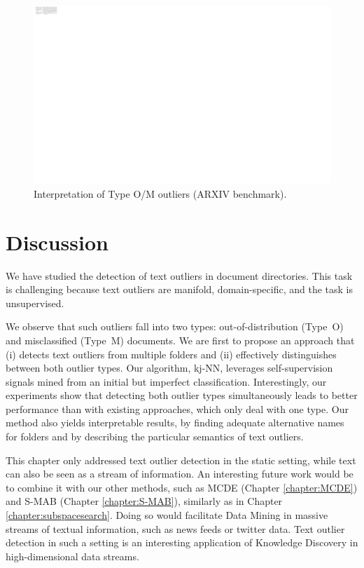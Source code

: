 \begin{figure}
	\includegraphics[width=\linewidth]{part4-figures/examples_ARXIV-Large-compressed.pdf}
	\caption{Interpretation of Type O/M outliers (ARXIV benchmark).}
	\label{fig:examples_arxiv}
\end{figure}

\section{Discussion}

We have studied the detection of text outliers in document directories. This task is challenging because text outliers are manifold, domain-specific, and the task is unsupervised. 

We observe that such outliers fall into two types: out-of-distribution (Type~O) and misclassified (Type~M) documents. We are first to propose an approach that (i) detects text outliers from multiple folders and (ii) effectively distinguishes between both outlier types. Our algorithm, \gls{kj-NN}, leverages self-supervision signals mined from an initial but imperfect classification. Interestingly, our experiments show that detecting both outlier types simultaneously leads to better performance %
than with existing approaches, which only deal with one type. Our method also yields interpretable results, by finding adequate alternative names for folders and by describing the particular semantics of text outliers. 

This chapter only addressed text outlier detection in the static setting, while text can also be seen as a stream of information. An interesting future work would be to combine it with our other methods, such as \acrshort{MCDE} (Chapter \ref{chapter:MCDE}) and \acrshort{S-MAB} (Chapter \ref{chapter:S-MAB}), similarly as in Chapter \ref{chapter:subspacesearch}. Doing so would facilitate Data Mining in massive streams of textual information, such as news feeds or twitter data. Text outlier detection in such a setting is an interesting application of Knowledge Discovery in high-dimensional data streams. 

